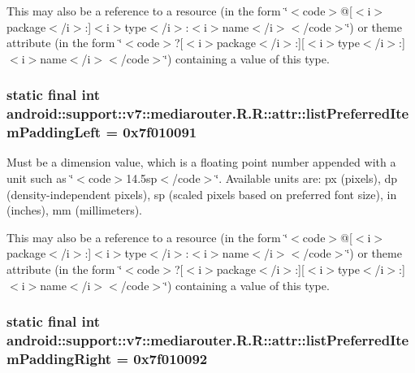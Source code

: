 This may also be a reference to a resource (in the form \char`\"{}$<$code$>$@\mbox{[}$<$i$>$package$<$/i$>$:\mbox{]}$<$i$>$type$<$/i$>$:$<$i$>$name$<$/i$>$$<$/code$>$\char`\"{}) or theme attribute (in the form \char`\"{}$<$code$>$?\mbox{[}$<$i$>$package$<$/i$>$:\mbox{]}\mbox{[}$<$i$>$type$<$/i$>$:\mbox{]}$<$i$>$name$<$/i$>$$<$/code$>$\char`\"{}) containing a value of this type. \hypertarget{classandroid_1_1support_1_1v7_1_1mediarouter_1_1_r_1_1attr_93e9ece80b6571e4c3b6161b4764bfb7}{
\subsubsection[{listPreferredItemPaddingLeft}]{\setlength{\rightskip}{0pt plus 5cm}static final int android::support::v7::mediarouter.R.R::attr::listPreferredItemPaddingLeft = 0x7f010091}}
\label{classandroid_1_1support_1_1v7_1_1mediarouter_1_1_r_1_1attr_93e9ece80b6571e4c3b6161b4764bfb7}


Must be a dimension value, which is a floating point number appended with a unit such as \char`\"{}$<$code$>$14.5sp$<$/code$>$\char`\"{}. Available units are: px (pixels), dp (density-independent pixels), sp (scaled pixels based on preferred font size), in (inches), mm (millimeters). 

This may also be a reference to a resource (in the form \char`\"{}$<$code$>$@\mbox{[}$<$i$>$package$<$/i$>$:\mbox{]}$<$i$>$type$<$/i$>$:$<$i$>$name$<$/i$>$$<$/code$>$\char`\"{}) or theme attribute (in the form \char`\"{}$<$code$>$?\mbox{[}$<$i$>$package$<$/i$>$:\mbox{]}\mbox{[}$<$i$>$type$<$/i$>$:\mbox{]}$<$i$>$name$<$/i$>$$<$/code$>$\char`\"{}) containing a value of this type. \hypertarget{classandroid_1_1support_1_1v7_1_1mediarouter_1_1_r_1_1attr_b55612a59efa725fbb40f0274cd1f8a1}{
\subsubsection[{listPreferredItemPaddingRight}]{\setlength{\rightskip}{0pt plus 5cm}static final int android::support::v7::mediarouter.R.R::attr::listPreferredItemPaddingRight = 0x7f010092}}
\label{classandroid_1_1support_1_1v7_1_1mediarouter_1_1_r_1_1attr_b55612a59efa725fbb40f0274cd1f8a1}


